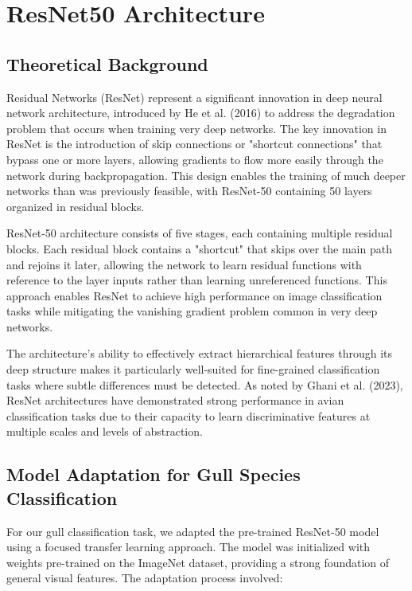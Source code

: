 


\section{ResNet50 Architecture}

\subsection{Theoretical Background}

Residual Networks (ResNet) represent a significant innovation in deep neural network architecture, introduced by He et al. (2016) to address the degradation problem that occurs when training very deep networks. The key innovation in ResNet is the introduction of skip connections or "shortcut connections" that bypass one or more layers, allowing gradients to flow more easily through the network during backpropagation\cite{residual2016}. This design enables the training of much deeper networks than was previously feasible, with ResNet-50 containing 50 layers organized in residual blocks\cite{resnet50blog}.

ResNet-50 architecture consists of five stages, each containing multiple residual blocks. Each residual block contains a "shortcut" that skips over the main path and rejoins it later, allowing the network to learn residual functions with reference to the layer inputs rather than learning unreferenced functions\cite{residual2016}\cite{exploratiojournal}. This approach enables ResNet to achieve high performance on image classification tasks while mitigating the vanishing gradient problem common in very deep networks.

The architecture's ability to effectively extract hierarchical features through its deep structure makes it particularly well-suited for fine-grained classification tasks where subtle differences must be detected. As noted by Ghani et al. (2023), ResNet architectures have demonstrated strong performance in avian classification tasks due to their capacity to learn discriminative features at multiple scales and levels of abstraction.

\subsection{Model Adaptation for Gull Species Classification}

For our gull classification task, we adapted the pre-trained ResNet-50 model using a focused transfer learning approach. The model was initialized with weights pre-trained on the ImageNet dataset, providing a strong foundation of general visual features. The adaptation process involved:

